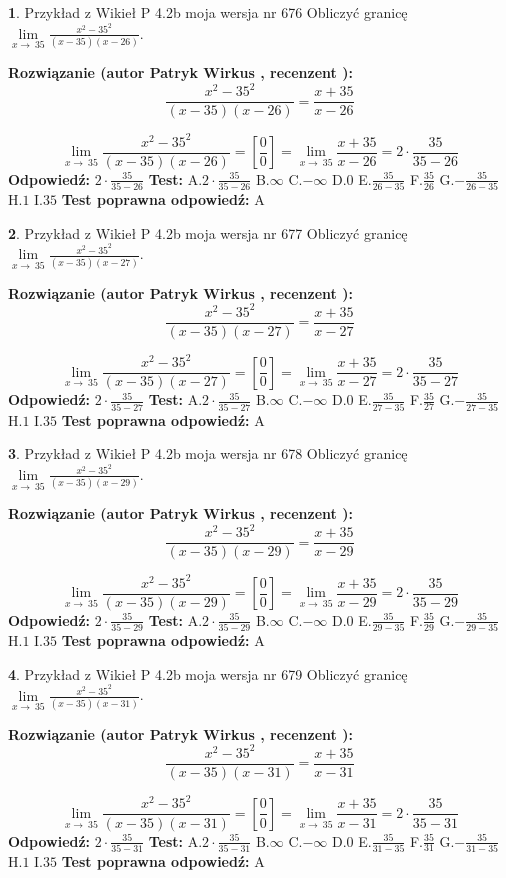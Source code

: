 \documentclass[12pt, a4paper]{article}
\theoremstyle{definition} %
\newtheorem{zad}{}
\newcommand{\zadStart}[1]{\begin{zad}#1\newline}
\newcommand{\zadStop}{\end{zad}}
\newcommand{\rozwStart}[2]{\noindent \textbf{Rozwiązanie (autor #1 , recenzent #2): }\newline}
\newcommand{\rozwStop}{\newline}
\newcommand{\odpStart}{\noindent \textbf{Odpowiedź:}\newline}
\newcommand{\odpStop}{\newline}
\newcommand{\testStart}{\noindent \textbf{Test:}\newline}
\newcommand{\testStop}{\newline}
\newcommand{\kluczStart}{\noindent \textbf{Test poprawna odpowiedź:}\newline}
\newcommand{\kluczStop}{\newline}
\begin{document}
\zadStart{Przykład z Wikieł P 4.2b moja wersja nr 676}
Obliczyć granicę $\lim\limits_{x\to\ 35}\frac{x^{2}-35^{2}}{(x-35)(x-26)}$.
\zadStop
\rozwStart{Patryk Wirkus}{}
$$\frac{x^{2}-35^{2}}{(x-35)(x-26)}=\frac{x+35}{x-26}$$

$$\lim\limits_{x\to\ 35}\frac{x^{2}-35^{2}}{(x-35)(x-26)}=[\frac{0}{0}]=\lim\limits_{x\to\ 35}\frac{x+35}{x-26}=2 \cdot \frac{35}{35-26}$$
\rozwStop
\odpStart
$2 \cdot \frac{35}{35-26}$
\odpStop
\testStart
A.$2 \cdot \frac{35}{35-26}$
B.$\infty$
C.$-\infty$
D.$0$
E.$\frac{35}{26-35}$
F.$\frac{35}{26}$
G.$-\frac{35}{26-35}$
H.$1$
I.$35$
\testStop
\kluczStart
A
\kluczStop



\zadStart{Przykład z Wikieł P 4.2b moja wersja nr 677}
Obliczyć granicę $\lim\limits_{x\to\ 35}\frac{x^{2}-35^{2}}{(x-35)(x-27)}$.
\zadStop
\rozwStart{Patryk Wirkus}{}
$$\frac{x^{2}-35^{2}}{(x-35)(x-27)}=\frac{x+35}{x-27}$$

$$\lim\limits_{x\to\ 35}\frac{x^{2}-35^{2}}{(x-35)(x-27)}=[\frac{0}{0}]=\lim\limits_{x\to\ 35}\frac{x+35}{x-27}=2 \cdot \frac{35}{35-27}$$
\rozwStop
\odpStart
$2 \cdot \frac{35}{35-27}$
\odpStop
\testStart
A.$2 \cdot \frac{35}{35-27}$
B.$\infty$
C.$-\infty$
D.$0$
E.$\frac{35}{27-35}$
F.$\frac{35}{27}$
G.$-\frac{35}{27-35}$
H.$1$
I.$35$
\testStop
\kluczStart
A
\kluczStop



\zadStart{Przykład z Wikieł P 4.2b moja wersja nr 678}
Obliczyć granicę $\lim\limits_{x\to\ 35}\frac{x^{2}-35^{2}}{(x-35)(x-29)}$.
\zadStop
\rozwStart{Patryk Wirkus}{}
$$\frac{x^{2}-35^{2}}{(x-35)(x-29)}=\frac{x+35}{x-29}$$

$$\lim\limits_{x\to\ 35}\frac{x^{2}-35^{2}}{(x-35)(x-29)}=[\frac{0}{0}]=\lim\limits_{x\to\ 35}\frac{x+35}{x-29}=2 \cdot \frac{35}{35-29}$$
\rozwStop
\odpStart
$2 \cdot \frac{35}{35-29}$
\odpStop
\testStart
A.$2 \cdot \frac{35}{35-29}$
B.$\infty$
C.$-\infty$
D.$0$
E.$\frac{35}{29-35}$
F.$\frac{35}{29}$
G.$-\frac{35}{29-35}$
H.$1$
I.$35$
\testStop
\kluczStart
A
\kluczStop



\zadStart{Przykład z Wikieł P 4.2b moja wersja nr 679}
Obliczyć granicę $\lim\limits_{x\to\ 35}\frac{x^{2}-35^{2}}{(x-35)(x-31)}$.
\zadStop
\rozwStart{Patryk Wirkus}{}
$$\frac{x^{2}-35^{2}}{(x-35)(x-31)}=\frac{x+35}{x-31}$$

$$\lim\limits_{x\to\ 35}\frac{x^{2}-35^{2}}{(x-35)(x-31)}=[\frac{0}{0}]=\lim\limits_{x\to\ 35}\frac{x+35}{x-31}=2 \cdot \frac{35}{35-31}$$
\rozwStop
\odpStart
$2 \cdot \frac{35}{35-31}$
\odpStop
\testStart
A.$2 \cdot \frac{35}{35-31}$
B.$\infty$
C.$-\infty$
D.$0$
E.$\frac{35}{31-35}$
F.$\frac{35}{31}$
G.$-\frac{35}{31-35}$
H.$1$
I.$35$
\testStop
\kluczStart
A
\kluczStop
\end{document}
